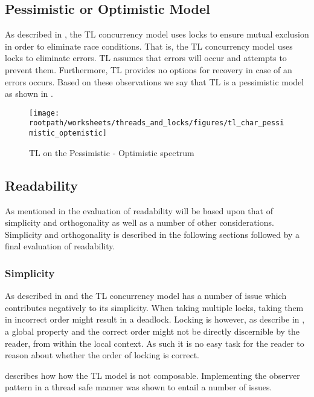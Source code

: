 \subsection{Pessimistic or Optimistic Model}
As described in , the \ac{TL} concurrency model uses locks to ensure mutual exclusion in order to eliminate race conditions. That is, the \ac{TL} concurrency model uses locks to eliminate errors. \ac{TL} assumes that errors will occur and attempts to prevent them. Furthermore, \ac{TL} provides no options for recovery in case of an errors occurs. Based on these observations we say that \ac{TL} is a pessimistic model as shown in .

\begin{figure}[htbp]
\centering
 \texttt{[image: \\rootpath/worksheets/threads\_and\_locks/figures/tl\_char\_pessimistic\_optemistic]} 
 \caption{\ac{TL} on the Pessimistic - Optimistic spectrum}
\label{fig:char_pes_opti}
\end{figure}

\subsection{Readability}
As mentioned in  the evaluation of readability will be based upon that of simplicity and orthogonality as well as a number of other considerations. Simplicity and orthogonality is described in the following sections followed by a final evaluation of readability.
\subsubsection{Simplicity}\label{subsec:tl_simplicity_read}
As described in  and  the \ac{TL} concurrency model has a number of issue which contributes negatively to its simplicity. When taking multiple locks, taking them in incorrect order might result in a deadlock. Locking is however, as describe in , a global property and the correct order might not be directly discernible by the reader, from within the local context. As such it is no easy task for the reader to reason about whether the order of locking is correct.

 describes how how the \ac{TL} model is not composable. Implementing the observer pattern in a thread safe manner was shown to entail a number of issues.

